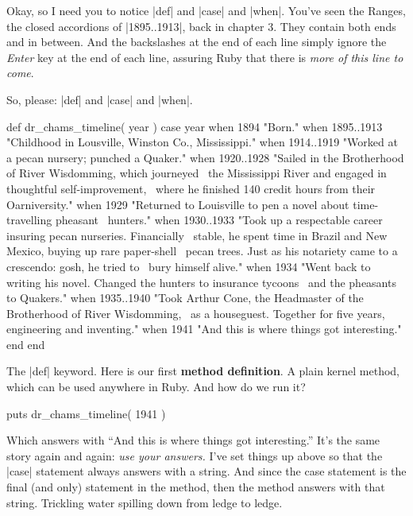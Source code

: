 \documentclass[12pt,twoside]{report}
\begin{document}
Okay, so I need you to notice \rubyinline|def| and
\rubyinline|case| and
\rubyinline|when|.  You've seen the Ranges, the closed
accordions of \rubyinline|1895..1913|, back in chapter
3.  They contain both ends and in between.  And the backslashes at the
end of each line simply ignore the {\em Enter} key at the end of each
line, assuring Ruby that there is {\em more of this line to come}.

So, please: \rubyinline|def| and
\rubyinline|case| and
\rubyinline|when|.


\begin{rubycode}

 def dr_chams_timeline( year )
   case year
   when 1894
     "Born."
   when 1895..1913
     "Childhood in Lousville, Winston Co., Mississippi."
   when 1914..1919
     "Worked at a pecan nursery; punched a Quaker."
   when 1920..1928
     "Sailed in the Brotherhood of River Wisdomming, which journeyed \
      the Mississippi River and engaged in thoughtful self-improvement, \
      where he finished 140 credit hours from their Oarniversity."
   when 1929
     "Returned to Louisville to pen a novel about time-travelling pheasant \
      hunters."
   when 1930..1933
     "Took up a respectable career insuring pecan nurseries.  Financially \
      stable, he spent time in Brazil and New Mexico, buying up rare paper-shell \
      pecan trees.  Just as his notariety came to a crescendo: gosh, he tried to \
      bury himself alive."
   when 1934
     "Went back to writing his novel.  Changed the hunters to insurance tycoons \
      and the pheasants to Quakers."
   when 1935..1940
     "Took Arthur Cone, the Headmaster of the Brotherhood of River Wisdomming, \
      as a houseguest.  Together for five years, engineering and inventing."
   when 1941
     "And this is where things got interesting."
   end
 end

\end{rubycode}


The \rubyinline|def| keyword.  Here is our first {\bf
  method definition}.  A plain kernel method, which can be used
anywhere in Ruby.  And how do we run it?


\begin{rubycode}

 puts dr_chams_timeline( 1941 )

\end{rubycode}


Which answers with ``And this is where things got interesting.''  It's
the same story again and again: {\em use your answers.}  I've set
things up above so that the \rubyinline|case|
statement always answers with a string. And since the case statement
is the final (and only) statement in the method, then the method
answers with that string.  Trickling water spilling down from ledge to
ledge.
\end{document}
